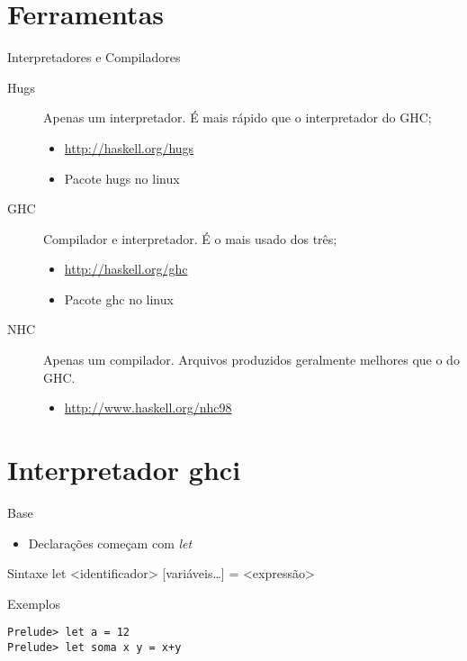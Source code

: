 \documentclass{beamer}
\begin{document}
\section{Ferramentas}

	\begin{frame}{}
	\end{frame}

	\begin{frame}{Interpretadores e Compiladores}
	 
	 \begin{description}
	  \item [Hugs] Apenas um interpretador. É mais rápido que o interpretador do GHC;
			\begin{itemize}
			 \item \url{http://haskell.org/hugs}
			 \item Pacote hugs no linux
			\end{itemize}
	  \item [GHC] Compilador e interpretador. É o mais usado dos três;
			\begin{itemize}
			 \item \url{http://haskell.org/ghc}
			 \item Pacote ghc no linux
			\end{itemize}
	  \item [NHC] Apenas um compilador. Arquivos produzidos geralmente melhores que o do GHC.
			\begin{itemize}
			 \item \url{http://www.haskell.org/nhc98}
			\end{itemize}
	 \end{description}	 
	\end{frame}
	
\section{Interpretador ghci}

		\begin{frame}{}
		\end{frame}

	\begin{frame}[fragile]{Base}
	 	 \begin{itemize}
	 	  \item Declarações começam com \textit{let}
	 	 \end{itemize}
	 	 \begin{block}{Sintaxe}
	 	  let <identificador> {[}variáveis\dots{]} = <expressão>
	 	 \end{block}
	 	 \begin{block}{Exemplos}
	 	  \begin{lstlisting}
Prelude> let a = 12
Prelude> let soma x y = x+y
	 	  \end{lstlisting}
	 	 \end{block}
	\end{frame}
	
\end{document}
